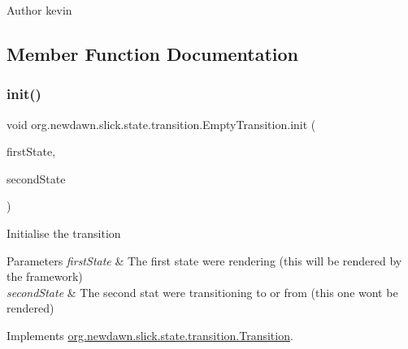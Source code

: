 \begin{DoxyAuthor}{Author}
kevin 
\end{DoxyAuthor}


\subsection{Member Function Documentation}
\mbox{\label{classorg_1_1newdawn_1_1slick_1_1state_1_1transition_1_1_empty_transition_a3f0213c8f0057187a3438bcecb2d3eb8}} 
\subsubsection{\texorpdfstring{init()}{init()}}
{\footnotesize\ttfamily void org.\+newdawn.\+slick.\+state.\+transition.\+Empty\+Transition.\+init (\begin{DoxyParamCaption}\item[{\mbox{\hyperlink{interfaceorg_1_1newdawn_1_1slick_1_1state_1_1_game_state}{Game\+State}}}]{first\+State,  }\item[{\mbox{\hyperlink{interfaceorg_1_1newdawn_1_1slick_1_1state_1_1_game_state}{Game\+State}}}]{second\+State }\end{DoxyParamCaption})\hspace{0.3cm}{\ttfamily [inline]}}

Initialise the transition


\begin{DoxyParams}{Parameters}
{\em first\+State} & The first state we\textquotesingle{}re rendering (this will be rendered by the framework) \\
\hline
{\em second\+State} & The second stat we\textquotesingle{}re transitioning to or from (this one won\textquotesingle{}t be rendered) \\
\hline
\end{DoxyParams}


Implements \mbox{\hyperlink{interfaceorg_1_1newdawn_1_1slick_1_1state_1_1transition_1_1_transition_a7b59f0c9205f1f0417ee18bc526e5b01}{org.\+newdawn.\+slick.\+state.\+transition.\+Transition}}.


